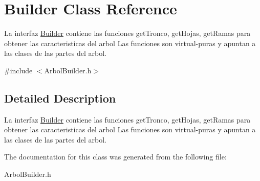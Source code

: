 \hypertarget{classBuilder}{}\section{Builder Class Reference}
\label{classBuilder}


La interfaz \hyperlink{classBuilder}{Builder} contiene las funciones get\+Tronco, get\+Hojas, get\+Ramas para obtener las caracteristicas del arbol  Las funciones son virtual-\/puras y apuntan a las clases de las partes del arbol.  




{\ttfamily \#include $<$Arbol\+Builder.\+h$>$}



\subsection{Detailed Description}
La interfaz \hyperlink{classBuilder}{Builder} contiene las funciones get\+Tronco, get\+Hojas, get\+Ramas para obtener las caracteristicas del arbol  Las funciones son virtual-\/puras y apuntan a las clases de las partes del arbol. 

The documentation for this class was generated from the following file\+:\begin{DoxyCompactItemize}
\item 
Arbol\+Builder.\+h\end{DoxyCompactItemize}
